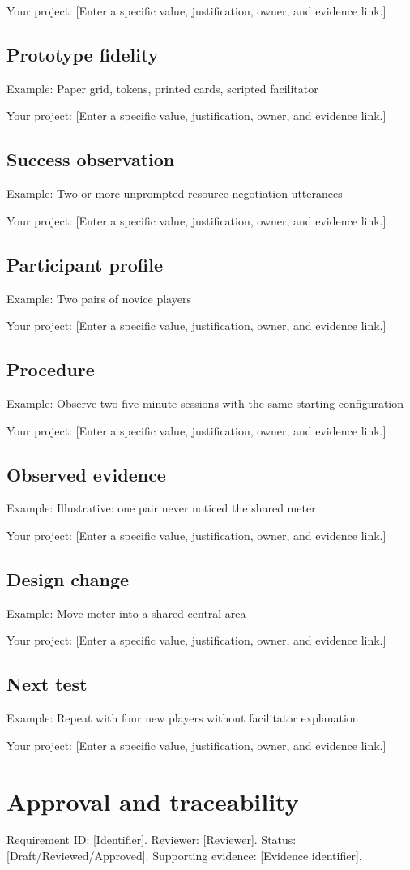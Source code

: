 \documentclass[11pt]{article}
\begin{document}
Your project: [Enter a specific value, justification, owner, and evidence link.]


\subsection{Prototype fidelity}
Example: Paper grid, tokens, printed cards, scripted facilitator

Your project: [Enter a specific value, justification, owner, and evidence link.]


\subsection{Success observation}
Example: Two or more unprompted resource-negotiation utterances

Your project: [Enter a specific value, justification, owner, and evidence link.]


\subsection{Participant profile}
Example: Two pairs of novice players

Your project: [Enter a specific value, justification, owner, and evidence link.]


\subsection{Procedure}
Example: Observe two five-minute sessions with the same starting configuration

Your project: [Enter a specific value, justification, owner, and evidence link.]


\subsection{Observed evidence}
Example: Illustrative: one pair never noticed the shared meter

Your project: [Enter a specific value, justification, owner, and evidence link.]


\subsection{Design change}
Example: Move meter into a shared central area

Your project: [Enter a specific value, justification, owner, and evidence link.]


\subsection{Next test}
Example: Repeat with four new players without facilitator explanation

Your project: [Enter a specific value, justification, owner, and evidence link.]


\section{Approval and traceability}
Requirement ID: [Identifier]. Reviewer: [Reviewer]. Status: [Draft/Reviewed/Approved]. Supporting evidence: [Evidence identifier].
\end{document}
